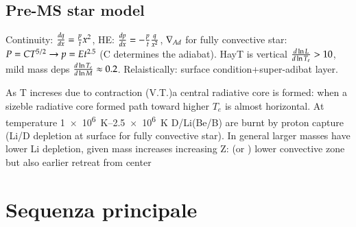 \subsection{Pre-MS star model}

Continuity: $\TDy{x}{q}=\frac{p}{t}x^2$, HE: $\TDy{x}{p}=-\frac{p}{t}\frac{q}{x^2}$, $\nad$ for fully convective star: $P=CT\expy{5/2}\to p=Et\expy{2.5}$ (C determines the adiabat).
HayT is vertical $\TDly{T_e}{L}>10$, mild mass deps $\TDly{M}{T_e}\approx0.2$. Relaistically: surface condition+super-adibat layer.

As T increses due to contraction (V.T.)a central radiative core is formed: when a sizeble radiative core formed path toward higher $T_e$ is almost horizontal.
At temperature \SIrange{1e6}{2.5e6}{\kelvin} D/Li(Be/B) are burnt by proton capture (Li/D depletion at surface for fully convective star).
In general larger masses have lower Li depletion, given mass increases increasing Z: (or ) lower convective zone but also earlier retreat from center


\section{Sequenza principale}

